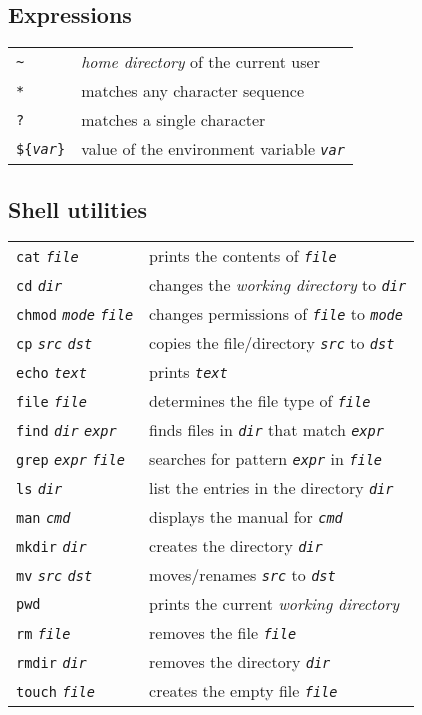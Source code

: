 \documentclass[landscape, a4paper]{article}
\newcommand{\cl}[1]{\texttt{#1}}
\newcommand{\cv}[1]{\textit{\texttt{#1}}}
\begin{document}
\begin{multicols*}{3}
\subsection*{Expressions}
\begin{tabular}{ll}
\cl{\textasciitilde} 		& \textit{home directory} of the current user\\
\cl{*} 						& matches any character sequence\\
\cl{?} 						& matches a single character\\
\cl{\$\{}\cv{var}\cl{\}}	& value of the environment variable \cv{var}
\end{tabular}

\subsection*{Shell utilities}
\begin{tabular}{ll}
\cl{cat} \cv{file} 				& prints the contents of \cv{file}\\
\cl{cd} \cv{dir} 				& changes the \textit{working directory} to \cv{dir}\\
\cl{chmod} \cv{mode} \cv{file} 	& changes permissions of \cv{file} to \cv{mode}\\
\cl{cp} \cv{src} \cv{dst} 		& copies the file/directory \cv{src} to \cv{dst}\\
\cl{echo} \cv{text} 			& prints \cv{text}\\
\cl{file} \cv{file} 			& determines the file type of \cv{file}\\
\cl{find} \cv{dir} \cv{expr} 	& finds files in \cv{dir} that match \cv{expr}\\
\cl{grep} \cv{expr} \cv{file} 	& searches for pattern \cv{expr} in \cv{file}\\
\cl{ls} \cv{dir} 				& list the entries in the directory \cv{dir}\\
\cl{man} \cv{cmd} 				& displays the manual for \cv{cmd}\\
\cl{mkdir} \cv{dir} 			& creates the directory \cv{dir}\\
\cl{mv} \cv{src} \cv{dst} 		& moves/renames \cv{src} to \cv{dst}\\
\cl{pwd} 						& prints the current \textit{working directory}\\
\cl{rm} \cv{file} 				& removes the file \cv{file}\\
\cl{rmdir} \cv{dir} 			& removes the directory \cv{dir}\\
\cl{touch} \cv{file} 			& creates the empty file \cv{file}
\end{tabular}

\end{multicols*}
\end{document}
